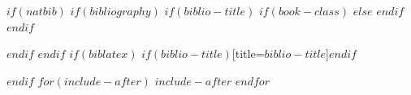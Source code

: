 \documentclass{article}
\begin{document}
$if(natbib)$
$if(bibliography)$
$if(biblio-title)$
$if(book-class)$
\renewcommand\bibname{$biblio-title$}
$else$
\renewcommand\refname{$biblio-title$}
$endif$
$endif$


$endif$
$endif$
$if(biblatex)$
\printbibliography$if(biblio-title)$[title=$biblio-title$]$endif$

$endif$
$for(include-after)$
$include-after$
\pagebreak
$endfor$

\pagestyle{empty}
\begin{titlepage}
  \BgThispage
  \null
\end{titlepage}
\end{document}
